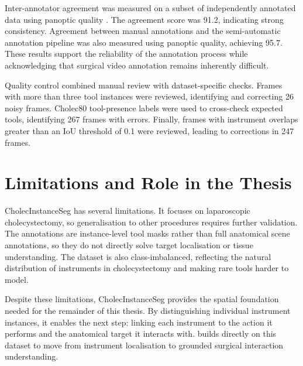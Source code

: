 Inter-annotator agreement was measured on a subset of independently annotated data using panoptic quality \cite{kirillov2019panoptic}. The agreement score was 91.2, indicating strong consistency. Agreement between manual annotations and the semi-automatic annotation pipeline was also measured using panoptic quality, achieving 95.7. These results support the reliability of the annotation process while acknowledging that surgical video annotation remains inherently difficult.

Quality control combined manual review with dataset-specific checks. Frames with more than three tool instances were reviewed, identifying and correcting 26 noisy frames. Cholec80 tool-presence labels were used to cross-check expected tools, identifying 267 frames with errors. Finally, frames with instrument overlaps greater than an IoU threshold of 0.1 were reviewed, leading to corrections in 247 frames.

\section{Limitations and Role in the Thesis}
\label{sec:cholecinstanceseg-limitations}

CholecInstanceSeg has several limitations. It focuses on laparoscopic cholecystectomy, so generalisation to other procedures requires further validation. The annotations are instance-level tool masks rather than full anatomical scene annotations, so they do not directly solve target localisation or tissue understanding. The dataset is also class-imbalanced, reflecting the natural distribution of instruments in cholecystectomy and making rare tools harder to model.

Despite these limitations, CholecInstanceSeg provides the spatial foundation needed for the remainder of this thesis. By distinguishing individual instrument instances, it enables the next step: linking each instrument to the action it performs and the anatomical target it interacts with.  builds directly on this dataset to move from instrument localisation to grounded surgical interaction understanding.
